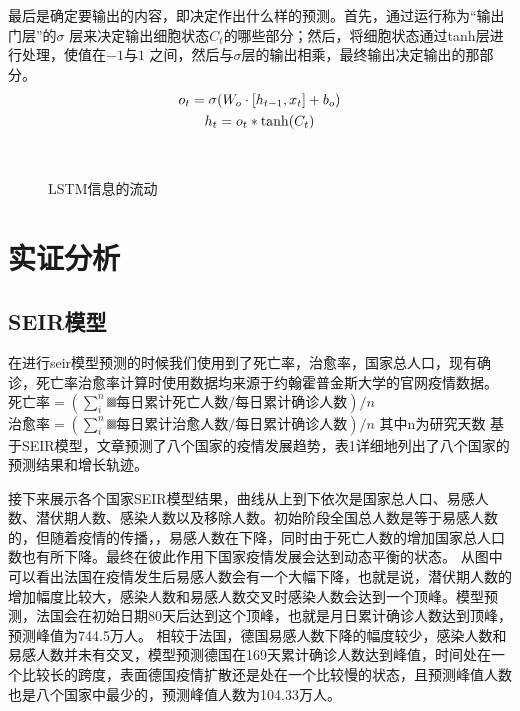 \documentclass[lang=cn,11pt,a4paper,cite=authoryear]{elegantpaper}
\begin{document}
最后是确定要输出的内容，即决定作出什么样的预测。首先，通过运行称为“输出门层”的$\sigma$
层来决定输出细胞状态$C_t$的哪些部分；然后，将细胞状态通过tanh层进行处理，使值在$-1$与$1$
之间，然后与$\sigma$层的输出相乘，最终输出决定输出的那部分。
\begin{gather}
o_t=\sigma(W_o \cdot [h_{t-1},x_t]+b_o) \\
h_t=o_t*{\rm tanh}(C_t)
\end{gather}

\begin{figure}[htp]
	\centering
	\\
    \caption{LSTM信息的流动}
	\label{fig:LSTM}
\end{figure}

\section{实证分析}

\subsection{SEIR模型}
在进行seir模型预测的时候我们使用到了死亡率，治愈率，国家总人口，现有确诊，死亡率治愈率计算时使用数据均来源于约翰霍普金斯大学的官网疫情数据。
$死亡率=(∑_i^n▒每日累计死亡人数/每日累计确诊人数)/n$
$治愈率=(∑_i^n▒每日累计治愈人数/每日累计确诊人数)/n$
其中n为研究天数
基于SEIR模型，文章预测了八个国家的疫情发展趋势，表1详细地列出了八个国家的预测结果和增长轨迹。

接下来展示各个国家SEIR模型结果，曲线从上到下依次是国家总人口、易感人数、潜伏期人数、感染人数以及移除人数。初始阶段全国总人数是等于易感人数的，但随着疫情的传播，，易感人数在下降，同时由于死亡人数的增加国家总人口数也有所下降。最终在彼此作用下国家疫情发展会达到动态平衡的状态。
从图中可以看出法国在疫情发生后易感人数会有一个大幅下降，也就是说，潜伏期人数的增加幅度比较大，感染人数和易感人数交叉时感染人数会达到一个顶峰。模型预测，法国会在初始日期80天后达到这个顶峰，也就是月日累计确诊人数达到顶峰，预测峰值为744.5万人。
相较于法国，德国易感人数下降的幅度较少，感染人数和易感人数并未有交叉，模型预测德国在169天累计确诊人数达到峰值，时间处在一个比较长的跨度，表面德国疫情扩散还是处在一个比较慢的状态，且预测峰值人数也是八个国家中最少的，预测峰值人数为104.33万人。
\end{document}
